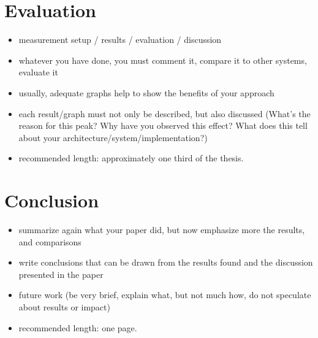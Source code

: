 \documentclass[]{nsm-thesis}
\begin{document}
\chapter{Evaluation}


\begin{itemize}
\item measurement setup / results / evaluation / discussion
\item whatever you have done, you must comment it, compare it to other systems, evaluate it
\item usually, adequate graphs help to show the benefits of your approach
\item each result/graph must not only be described, but also discussed (What's the reason for this peak? Why have you observed this effect? What does this tell about your architecture/system/implementation?)
\item recommended length: approximately one third of the thesis.
\end{itemize}



\chapter{Conclusion}


\begin{itemize}
\item summarize again what your paper did, but now emphasize more the results, and comparisons
\item write conclusions that can be drawn from the results found and the discussion presented in the paper
\item future work (be very brief, explain what, but not much how, do not speculate about results or impact)
\item recommended length: one page.
\end{itemize}



\cleardoublepage

\listofabbreviations
\clearpage

\listoffigures
\clearpage

\listoftables
\clearpage

\printbibliography
\end{document}
